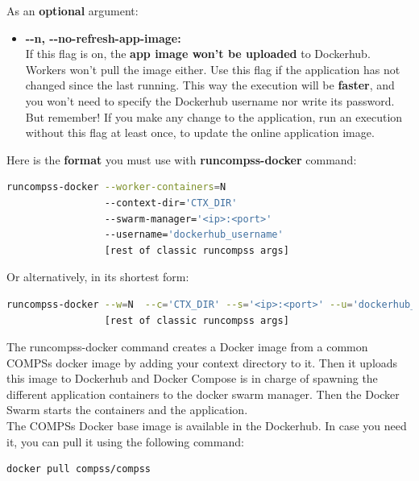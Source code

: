 As an \textbf{optional} argument:
\begin{itemize}
 \item { 
 \textbf{-{}-n, -{}-no-refresh-app-image:} \\
 If this flag is on, the \textbf{app image won't be uploaded }to Dockerhub.
 Workers won't pull the image either.
 Use this flag if the application has not changed since the last running.
 This way the execution will be \textbf{faster}, and you won't need to specify the Dockerhub username nor write its password.
 But remember! If you make any change to the application, run an execution without this flag at least once, 
 to update the online application image.
 }
\end{itemize}

Here is the \textbf{format} you must use with \textbf{runcompss-docker} command:
\begin{lstlisting}[language=bash]
runcompss-docker --worker-containers=N 
                 --context-dir='CTX_DIR'
                 --swarm-manager='<ip>:<port>'
                 --username='dockerhub_username'
                 [rest of classic runcompss args]
\end{lstlisting}           

Or alternatively, in its shortest form:
\begin{lstlisting}[language=bash]
runcompss-docker --w=N  --c='CTX_DIR' --s='<ip>:<port>' --u='dockerhub_username' 
                 [rest of classic runcompss args]
\end{lstlisting}        

The runcompss-docker command creates a Docker image from a common COMPSs docker image by adding your context directory to it. 
Then it uploads this image to Dockerhub and Docker Compose is in charge of spawning the different application containers to the docker swarm manager.
Then the Docker Swarm starts the containers and the application.
\\
The COMPSs Docker base image is available in the Dockerhub. In case you need it, you can pull it using the following command:
\begin{lstlisting}[language=bash]
docker pull compss/compss
\end{lstlisting}

